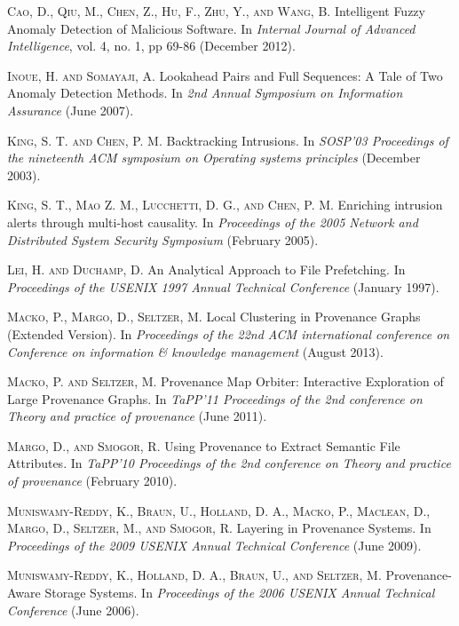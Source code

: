 \documentclass[10pt,twocolumn]{article}
\begin{document}
\begin{thebibliography}{99}

\textsc{Cao, D., Qiu, M., Chen, Z., Hu, F., Zhu, Y., and Wang, B.} Intelligent Fuzzy Anomaly Detection of Malicious Software. In {\em Internal Journal of Advanced Intelligence}, vol. 4, no. 1, pp 69-86 (December 2012).

\textsc{Inoue, H. and Somayaji, A.} Lookahead Pairs and Full Sequences: A Tale of Two Anomaly Detection Methods. In {\em 2nd Annual Symposium on Information Assurance} (June 2007). 

\textsc{King, S. T. and Chen, P. M.} Backtracking Intrusions. In {\em SOSP'03 Proceedings of the nineteenth ACM symposium on Operating systems principles} (December 2003).

\textsc{King, S. T., Mao Z. M., Lucchetti, D. G., and Chen, P. M.} Enriching intrusion alerts through multi-host causality. In {\em Proceedings of the 2005 Network and Distributed System Security Symposium} (February 2005).

\textsc{Lei, H. and Duchamp, D.} An Analytical Approach to File Prefetching. In {\em Proceedings of the USENIX 1997 Annual Technical Conference} (January 1997).

\textsc{Macko, P., Margo, D., Seltzer, M.} Local Clustering in Provenance Graphs (Extended Version). In {\em Proceedings of the 22nd ACM international conference on Conference on information \& knowledge management} (August 2013).

\textsc{Macko, P. and Seltzer, M.} Provenance Map Orbiter: Interactive Exploration of Large Provenance Graphs. In {\em TaPP'11 Proceedings of the 2nd conference on Theory and practice of provenance} (June 2011).

\textsc{Margo, D., and Smogor, R.} Using Provenance to Extract Semantic File Attributes. In {\em TaPP'10 Proceedings of the 2nd conference on Theory and practice of provenance} (February 2010).

\textsc{Muniswamy-Reddy, K., Braun, U., Holland, D. A., Macko, P., Maclean, D., Margo, D., Seltzer, M., and Smogor, R.} Layering in Provenance Systems. In {\em Proceedings of the 2009 USENIX Annual Technical Conference} (June 2009).

\textsc{Muniswamy-Reddy, K., Holland, D. A., Braun, U., and Seltzer, M.} Provenance-Aware Storage Systems. In {\em Proceedings of the 2006 USENIX Annual Technical Conference} (June 2006).


\end{thebibliography}
\end{document}

